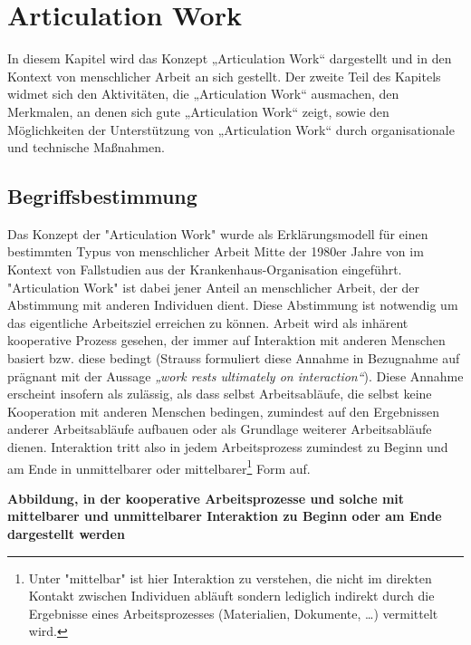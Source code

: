 \chapter{Articulation Work} %
\label{cha:articulation_work}

In diesem Kapitel wird das Konzept „Articulation Work“ dargestellt und in den Kontext von menschlicher Arbeit an sich gestellt. Der zweite Teil des Kapitels widmet sich den Aktivitäten, die „Articulation Work“ ausmachen, den Merkmalen, an denen sich gute „Articulation Work“ zeigt, sowie den Möglichkeiten der Unterstützung von „Articulation Work“ durch organisationale und technische Maßnahmen.

\section{Begriffsbestimmung} %
\label{sec:begriffsbestimmung}

Das Konzept der "Articulation Work" wurde als Erklärungsmodell für einen bestimmten Typus von menschlicher Arbeit Mitte der 1980er Jahre von  \citet{Strauss85} im Kontext von Fallstudien aus der Krankenhaus-Organisation eingeführt. "Articulation Work" ist dabei jener Anteil an menschlicher Arbeit, der der Abstimmung mit anderen Individuen dient. Diese Abstimmung ist notwendig um das eigentliche Arbeitsziel erreichen zu können. Arbeit wird als inhärent kooperative Prozess gesehen, der immer auf Interaktion mit anderen Menschen basiert bzw. diese bedingt (Strauss formuliert diese Annahme in Bezugnahme auf \citet{Hughes71} prägnant mit der Aussage \emph{„work rests ultimately on interaction“}). Diese Annahme erscheint insofern als zulässig, als dass selbst Arbeitsabläufe, die selbst keine Kooperation mit anderen Menschen bedingen, zumindest auf den Ergebnissen anderer Arbeitsabläufe aufbauen oder als Grundlage weiterer Arbeitsabläufe dienen. Interaktion tritt also in jedem Arbeitsprozess zumindest zu Beginn und am Ende in unmittelbarer oder mittelbarer\footnote{Unter "mittelbar" ist hier Interaktion zu verstehen, die nicht im direkten Kontakt zwischen Individuen abläuft sondern lediglich indirekt durch die Ergebnisse eines Arbeitsprozesses (Materialien, Dokumente, \ldots) vermittelt wird.} Form auf. 

\textbf{Abbildung, in der kooperative Arbeitsprozesse und solche mit mittelbarer und unmittelbarer Interaktion zu Beginn oder am Ende dargestellt werden}

